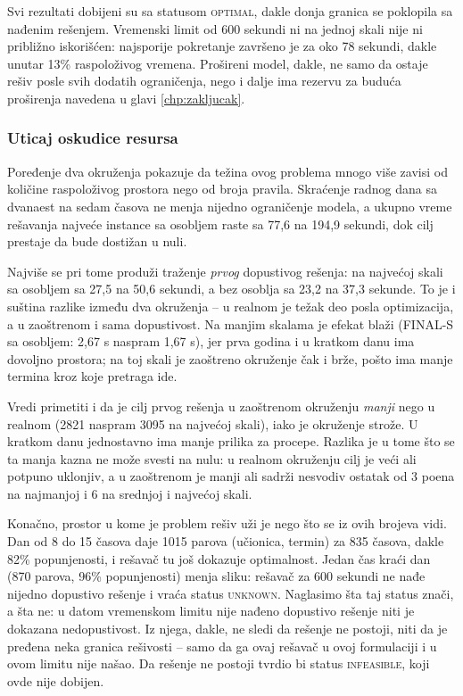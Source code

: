 \documentclass[12pt,oneside]{memoir}
\begin{document}
Svi rezultati dobijeni su sa statusom \textsc{optimal}, dakle donja
granica se poklopila sa nađenim rešenjem. Vremenski limit od 600 sekundi
ni na jednoj skali nije ni približno iskorišćen: najsporije pokretanje
završeno je za oko 78 sekundi, dakle unutar 13\% raspoloživog vremena.
Prošireni model, dakle, ne samo da ostaje rešiv posle svih dodatih
ograničenja, nego i dalje ima rezervu za buduća proširenja navedena u
glavi \ref{chp:zakljucak}.

\subsubsection{Uticaj oskudice resursa}

Poređenje dva okruženja pokazuje da težina ovog problema mnogo više
zavisi od količine raspoloživog prostora nego od broja pravila.
Skraćenje radnog dana sa dvanaest na sedam časova ne menja nijedno
ograničenje modela, a ukupno vreme rešavanja najveće instance sa
osobljem raste sa 77,6 na 194,9 sekundi, dok cilj prestaje da bude
dostižan u nuli.

Najviše se pri tome produži traženje \emph{prvog} dopustivog rešenja:
na najvećoj skali sa osobljem sa 27,5 na 50,6 sekundi, a bez osoblja sa
23,2 na 37,3 sekunde. To je i suština razlike između dva okruženja -- u
realnom je težak deo posla optimizacija, a u zaoštrenom i sama
dopustivost. Na manjim skalama je efekat blaži (FINAL-S sa osobljem:
2,67 s naspram 1,67 s), jer prva godina i u kratkom danu ima dovoljno
prostora; na toj skali je zaoštreno okruženje čak i brže, pošto ima
manje termina kroz koje pretraga ide.

Vredi primetiti i da je cilj prvog rešenja u zaoštrenom okruženju
\emph{manji} nego u realnom (2821 naspram 3095 na najvećoj skali), iako
je okruženje strože. U kratkom danu jednostavno ima manje prilika za
procepe. Razlika je u tome što se ta manja kazna ne može svesti na nulu:
u realnom okruženju cilj je veći ali potpuno uklonjiv, a u zaoštrenom je
manji ali sadrži nesvodiv ostatak od 3 poena na najmanjoj i 6 na
srednjoj i najvećoj skali.

Konačno, prostor u kome je problem rešiv uži je nego što se iz ovih
brojeva vidi. Dan od 8 do 15 časova daje 1015 parova (učionica, termin)
za 835 časova, dakle 82\% popunjenosti, i rešavač tu još dokazuje
optimalnost. Jedan čas kraći dan (870 parova, 96\% popunjenosti) menja
sliku: rešavač za 600 sekundi ne nađe nijedno dopustivo rešenje i vraća
status \textsc{unknown}. Naglasimo šta taj status znači, a šta ne: u
datom vremenskom limitu nije nađeno dopustivo rešenje niti je dokazana
nedopustivost. Iz njega, dakle, ne sledi da rešenje ne postoji, niti da
je pređena neka granica rešivosti -- samo da ga ovaj rešavač u ovoj
formulaciji i u ovom limitu nije našao. Da rešenje ne postoji tvrdio bi
status \textsc{infeasible}, koji ovde nije dobijen.
\end{document}
